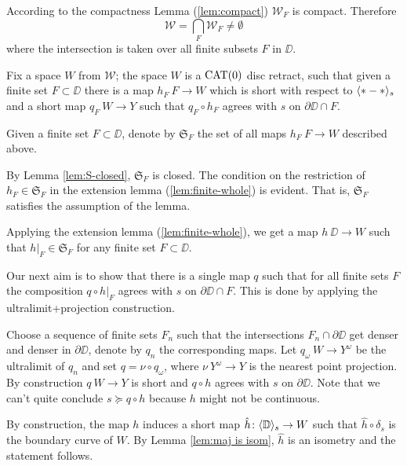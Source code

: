 According to the compactness Lemma (\ref{lem:compact}) $\mathcal{W}_F$ is compact.
Therefore 
\[\mathcal{W}
=
\bigcap_{F}\mathcal{W}_F\ne \emptyset\]
where the intersection is taken over all finite subsets $F$ in $\DD$. 


Fix a space $W$ from $\mathcal{W}$;
the space $W$ is a $\mathop{\rm CAT}\nolimits(0)$ disc retract,
such that given a finite set $F\subset \DD$ there is a map $h_F\:F\to W$ which is short with 
respect to $\langle{*}-{*}\rangle_s$ 
and a short map $q_F\:W\to Y$ such that $q_F\circ h_F$ agrees with $s$ on $\partial\DD\cap F$.

Given a finite set $F\subset \DD$,
denote by $\mathfrak{S}_F$ the set of all maps $h_F\:F\to W$ described above.

By Lemma \ref{lem:S-closed}, $\mathfrak{S}_F$ is closed.
The condition on the restriction of $h_F\in  \mathfrak{S}_F$ in the extension lemma (\ref{lem:finite-whole}) is evident.
That is, $\mathfrak{S}_F$ satisfies the assumption of the lemma.

Applying the extension lemma (\ref{lem:finite-whole}),
we get a map $h\:\DD\to W$ such that $h|_F\in \mathfrak{S}_F$
for any finite set $F\subset \DD$.

Our next aim is to show that there is a single map $q$ such that
for all finite sets $F$ the composition $q\circ h|_F$ agrees with
$s$ on $\partial\DD\cap F$.
This is done by applying the ultralimit+projection construction.

Choose a sequence of finite sets $F_n$ such that the intersections $F_n\cap\partial \DD$ get denser and denser in $\partial \DD$, 
denote by $q_n$ the corresponding maps.
Let $q_\omega\:W\to Y^\omega$ be the ultralimit of $q_n$ and set $q=\nu\circ q_\omega$,
where $\nu\:Y^\omega\to Y$ is the nearest point projection.
By construction $q\:W\to Y$ is short and $q\circ h$ agrees with $s$ on $\partial \DD$.
Note that we can't quite conclude $s\succcurlyeq q\circ h$ because $h$ might not be continuous.

By construction, the map $h$ induces a short map $\hat h\colon\langle\mathbb{D}\rangle_s\to W$ 
such that $\hat h\circ\delta_s$ is the boundary curve of $W$.
By Lemma \ref{lem:maj is isom}, $\hat h$ is an isometry and the statement follows.
\qeds